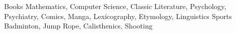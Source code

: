 



\begin{cvskills}
  \cvskill
    {Books} %
    {Mathematics, Computer Science, Classic Literature, Psychology, Psychiatry, Comics, Manga, Lexicography, Etymology, Linguistics} %
  \cvskill
    {Sports} %
    {Badminton, Jump Rope, Calisthenics, Shooting} %

\end{cvskills}